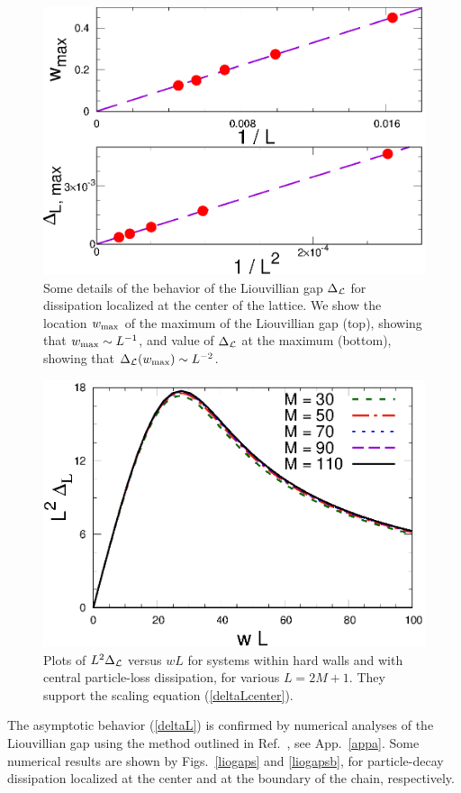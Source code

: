   
  \begin{figure}[!htb]
\centering
      \includegraphics[width=0.65\columnwidth]{imm/wDmax1.eps}
    \caption{Some details of the behavior of the Liouvillian gap
      $\Delta_{\cal L}$ for dissipation localized at the center of the
      lattice. We show the location $w_{\rm max}$ of the maximum of the
      Liouvillian gap (top), showing that $w_{\rm max}\sim L^{-1}$, and
      value of $\Delta_{\cal L}$ at the maximum (bottom), showing that
      $\Delta_{\cal L}(w_{\rm max})\sim L^{-2}$.}
    \label{gapcenterdetails}
  \end{figure}
  
  
  \begin{figure}[!htb]
\centering
    \includegraphics[width=0.65\columnwidth]{imm/DeltawLNo.eps}
    \caption{Plots of $L^2 \Delta_{\cal L}$ versus $wL$ for systems
      within hard walls and with central particle-loss dissipation, for
      various $L=2M+1$.  They support the scaling equation
      (\ref{deltaLcenter}).}
        \label{gapcenter2}
  \end{figure}
  
  The asymptotic behavior (\ref{deltaL}) is confirmed by numerical
  analyses of the Liouvillian gap using the method outlined in
  Ref.~\cite{PP-08}, see App.~\ref{appa}. Some numerical results are
  shown by Figs.~\ref{liogaps} and \ref{liogapsb}, for particle-decay
  dissipation localized at the center and at the boundary of the chain,
  respectively.
  
